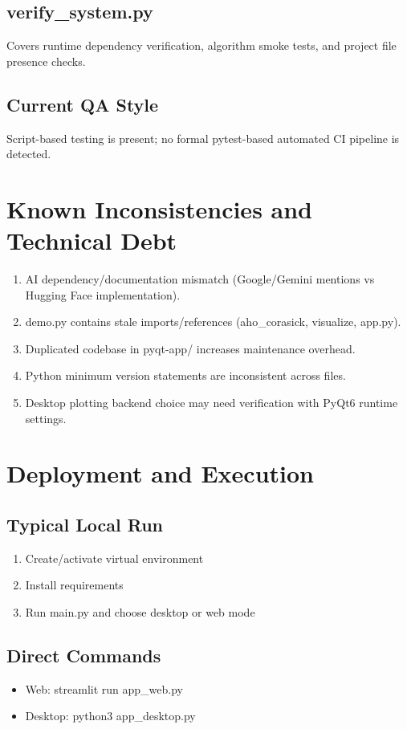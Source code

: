 \documentclass[11pt]{article}
\begin{document}
\subsection{verify\_system.py}
Covers runtime dependency verification, algorithm smoke tests, and project file presence checks.

\subsection{Current QA Style}
Script-based testing is present; no formal pytest-based automated CI pipeline is detected.

\section{Known Inconsistencies and Technical Debt}
\begin{enumerate}[leftmargin=*]
  \item AI dependency/documentation mismatch (Google/Gemini mentions vs Hugging Face implementation).
  \item demo.py contains stale imports/references (aho\_corasick, visualize, app.py).
  \item Duplicated codebase in pyqt-app/ increases maintenance overhead.
  \item Python minimum version statements are inconsistent across files.
  \item Desktop plotting backend choice may need verification with PyQt6 runtime settings.
\end{enumerate}

\section{Deployment and Execution}
\subsection{Typical Local Run}
\begin{enumerate}[leftmargin=*]
  \item Create/activate virtual environment
  \item Install requirements
  \item Run main.py and choose desktop or web mode
\end{enumerate}

\subsection{Direct Commands}
\begin{itemize}[leftmargin=*]
  \item Web: streamlit run app\_web.py
  \item Desktop: python3 app\_desktop.py
\end{itemize}
\end{document}
